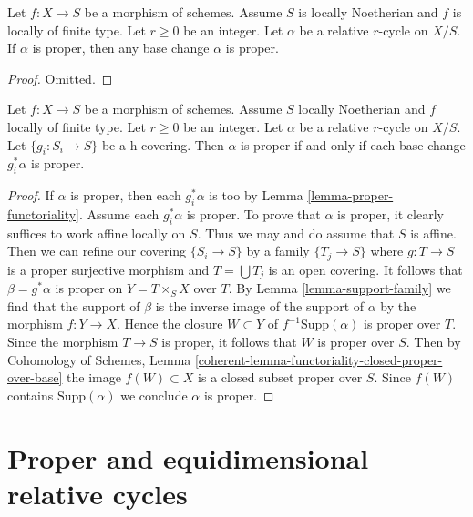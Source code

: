 \begin{lemma}
\label{lemma-proper-functoriality}
Let $f : X \to S$ be a morphism of schemes. Assume $S$ is locally Noetherian
and $f$ is locally of finite type. Let $r \geq 0$ be an integer. Let
$\alpha$ be a relative $r$-cycle on $X/S$. If $\alpha$ is proper,
then any base change $\alpha$ is proper.
\end{lemma}

\begin{proof}
Omitted.
\end{proof}

\begin{lemma}
\label{lemma-proper-h-descent}
Let $f : X \to S$ be a morphism of schemes. Assume $S$ locally Noetherian
and $f$ locally of finite type. Let $r \geq 0$ be an integer. Let $\alpha$
be a relative $r$-cycle on $X/S$. Let $\{g_i : S_i \to S\}$
be a h covering. Then $\alpha$ is proper
if and only if each base change $g_i^*\alpha$ is proper.
\end{lemma}

\begin{proof}
If $\alpha$ is proper, then each $g_i^*\alpha$ is too by
Lemma \ref{lemma-proper-functoriality}. Assume each $g_i^*\alpha$
is proper. To prove that $\alpha$ is proper, it clearly suffices
to work affine locally on $S$. Thus we may and do assume that $S$
is affine. Then we can refine our covering $\{S_i \to S\}$
by a family $\{T_j \to S\}$ where $g : T \to S$ is a proper surjective
morphism and $T = \bigcup T_j$ is an open covering.
It follows that $\beta = g^*\alpha$ is proper on $Y = T \times_S X$
over $T$. By Lemma \ref{lemma-support-family} we find that the support
of $\beta$ is the inverse image of the support of $\alpha$ by the
morphism $f : Y \to X$. Hence the closure $W \subset Y$
of $f^{-1}\text{Supp}(\alpha)$ is proper over $T$. Since the
morphism $T \to S$ is proper, it follows that $W$ is proper over $S$.
Then by Cohomology of Schemes, Lemma
\ref{coherent-lemma-functoriality-closed-proper-over-base}
the image $f(W) \subset X$ is a closed subset proper over $S$.
Since $f(W)$ contains $\text{Supp}(\alpha)$ we conclude $\alpha$
is proper.
\end{proof}



\section{Proper and equidimensional relative cycles}
\label{section-proper-equidimensional}

